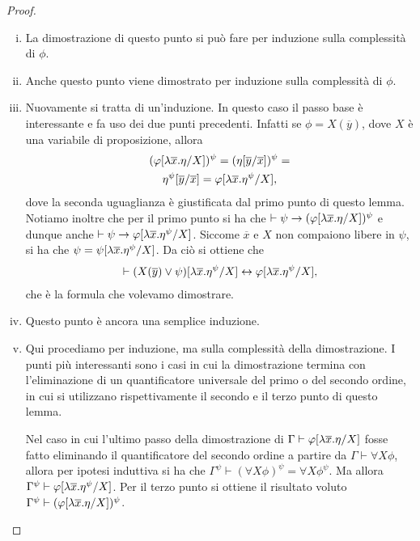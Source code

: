 \documentclass[]{marticle}
\begin{document}
\begin{proof}
    \begin{enumerate}[(i)]
        \item La dimostrazione di questo punto si pu\`o fare per induzione sulla
            complessit\`a di $\phi$.
        \item Anche questo punto viene dimostrato per induzione sulla
            complessit\`a di $\phi$. 
        \item Nuovamente si tratta di un'induzione. In questo caso il passo base
            \`e interessante e fa uso dei due punti precedenti. Infatti se
            $\phi=X(\overline{y})$, dove $X$ \`e una variabile di proposizione,
            allora 
            \begin{gather*}
                (\varphi[\lambda \overline{x}.\eta/X])^\psi  = 
                (\eta[\overline{y}/\overline{x}])^\psi = \\
                \eta^\psi[\overline{y}/\overline{x}]= 
                \varphi[\lambda \overline{x}.\eta^\psi/X],
            \end{gather*}
            dove la seconda uguaglianza \`e giustificata dal primo punto di
            questo lemma.  Notiamo inoltre che per il primo punto si ha che
            $\vdash \psi \rightarrow (\varphi[\lambda \overline{x}.\eta/X])^\psi$ e dunque
            anche $\vdash \psi \rightarrow \varphi[\lambda \overline{x}.\eta^\psi/X]$.
            Siccome $\overline{x}$ e $X$ non compaiono libere in $\psi$, si ha
            che $\psi = \psi [\lambda \overline{x}.\eta^\psi/X]$. Da ci\`o si
            ottiene che
            \begin{gather*}
                \vdash
                (X(\overline{y})
                \lor\psi)[\lambda \overline{x}.\eta ^\psi/X]
                \leftrightarrow \varphi [\lambda \overline{x}.\eta ^\psi/X],
            \end{gather*}
            che \`e la formula che volevamo dimostrare.
        \item Questo punto \`e ancora una semplice induzione.
        \item Qui procediamo per induzione, ma sulla complessit\`a della
            dimostrazione. I punti pi\`u interessanti sono i casi in cui la
            dimostrazione termina con l'eliminazione di un quantificatore
            universale del primo o del secondo ordine, in cui si utilizzano
            rispettivamente il secondo e il terzo punto di questo lemma.

            Nel caso in cui l'ultimo passo della dimostrazione di $\Gamma \vdash
            \varphi [\lambda \overline{x}. \eta/X]$ fosse fatto eliminando il
            quantificatore del secondo ordine a partire da $\Gamma \vdash
            \forall X \phi$, allora per ipotesi induttiva si ha che $\Gamma^\psi
            \vdash (\forall X \phi)^\psi = \forall X \phi^\psi$. Ma allora
            $\Gamma^\psi \vdash \varphi[\lambda \overline{x}. \eta^\psi/X]$. Per il
            terzo punto si ottiene il risultato voluto $\Gamma ^\psi \vdash
            (\varphi[\lambda \overline{x}.\eta/X])^\psi$.


\end{enumerate}
\end{proof}
\end{document}
